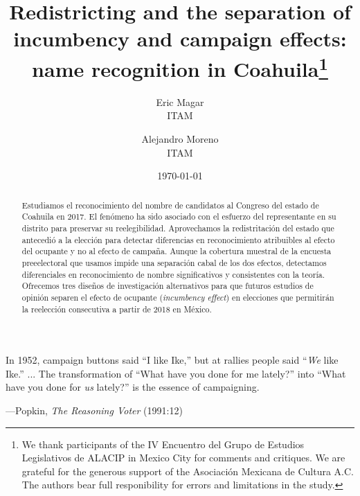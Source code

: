 \documentclass[letter,12pt]{article}
\begin{document}
\title{Redistricting and the separation of incumbency and campaign effects: name recognition in Coahuila\thanks{We thank participants of the IV Encuentro del Grupo de Estudios Legislativos de ALACIP in Mexico City for comments and critiques. We are grateful for the generous support of the Asociación Mexicana de Cultura A.C. The authors bear full responibility for errors and limitations in the study.}}
\author{Eric Magar  \\ ITAM \and
        Alejandro Moreno \\ ITAM 
}
\date{\today}
\maketitle


\begin{abstract}
\noindent Estudiamos el reconocimiento del nombre de candidatos al Congreso del estado de Coahuila en 2017. El fenómeno ha sido asociado con el esfuerzo del representante en su distrito para preservar su reelegibilidad. Aprovechamos la redistritación del estado que antecedió a la elección para detectar diferencias en reconocimiento atribuibles al efecto del ocupante y no al efecto de campaña. Aunque la cobertura muestral de la encuesta preeelectoral que usamos impide una separación cabal de los dos efectos, detectamos diferenciales en reconocimiento de nombre significativos y consistentes con la teoría. Ofrecemos tres diseños de investigación alternativos para que futuros estudios de opinión separen el efecto de ocupante (\emph{incumbency effect}) en elecciones que permitirán la reelección consecutiva a partir de 2018 en México. 
\end{abstract}

\epigraph{
  In 1952, campaign buttons said ``I like Ike,'' but at rallies people said ``\emph{We} like Ike.'' ... The transformation of ``What have you done for me lately?'' into ``What have you done for \emph{us} lately?'' is the essence of campaigning.}{---Popkin, \emph{The Reasoning Voter} (1991:12)}
\end{document}
